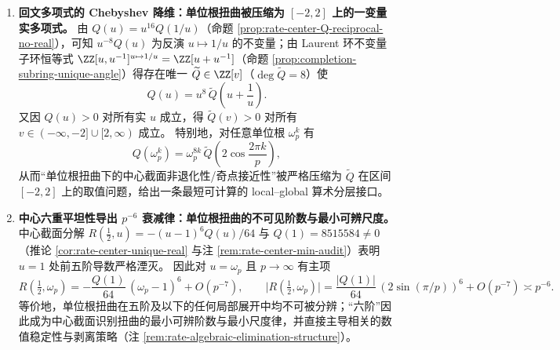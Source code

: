 \begin{enumerate}
  \item \textbf{回文多项式的 Chebyshev 降维：单位根扭曲被压缩为 \texorpdfstring{$[-2,2]$}{[-2,2]} 上的一变量实多项式。}
  由 \(Q(u)=u^{16}Q(1/u)\)（命题 \ref{prop:rate-center-Q-reciprocal-no-real}），可知 \(u^{-8}Q(u)\) 为反演 \(u\mapsto 1/u\) 的不变量；由 Laurent 环不变量子环恒等式 \(\ZZ[u,u^{-1}]^{u\mapsto 1/u}=\ZZ[u+u^{-1}]\)（命题 \ref{prop:completion-subring-unique-angle}）得存在唯一 \(\widetilde Q\in\ZZ[v]\)（\(\deg\widetilde Q=8\)）使
  \[
  Q(u)=u^8\,\widetilde Q\!\left(u+\frac1u\right).
  \]
  又因 \(Q(u)>0\) 对所有实 \(u\) 成立，得 \(\widetilde Q(v)>0\) 对所有 \(v\in(-\infty,-2]\cup[2,\infty)\) 成立。
  特别地，对任意单位根 \(\omega_p^k\) 有
  \[
  Q(\omega_p^k)=\omega_p^{8k}\,\widetilde Q\!\left(2\cos\frac{2\pi k}{p}\right),
  \]
  从而“单位根扭曲下的中心截面非退化性/奇点接近性”被严格压缩为 \(\widetilde Q\) 在区间 \([-2,2]\) 上的取值问题，给出一条最短可计算的 local--global 算术分层接口。

  \item \textbf{中心六重平坦性导出 \texorpdfstring{$p^{-6}$}{p^-6} 衰减律：单位根扭曲的不可见阶数与最小可辨尺度。}
  中心截面分解 \(R(\tfrac12,u)=-(u-1)^6Q(u)/64\) 与 \(Q(1)=8515584\neq 0\)（推论 \ref{cor:rate-center-unique-real} 与注 \ref{rem:rate-center-min-audit}）表明 \(u=1\) 处前五阶导数严格湮灭。
  因此对 \(u=\omega_p\) 且 \(p\to\infty\) 有主项
  \[
  R\!\left(\tfrac12,\omega_p\right)
  =-\frac{Q(1)}{64}\,(\omega_p-1)^6+O(p^{-7}),
  \qquad
  \bigl|R\!\left(\tfrac12,\omega_p\right)\bigr|
  =\frac{|Q(1)|}{64}\,(2\sin(\pi/p))^6+O(p^{-7})\asymp p^{-6}.
  \]
  等价地，单位根扭曲在五阶及以下的任何局部展开中均不可被分辨；“六阶”因此成为中心截面识别扭曲的最小可辨阶数与最小尺度律，并直接主导相关的数值稳定性与剥离策略（注 \ref{rem:rate-algebraic-elimination-structure}）。
\end{enumerate}

